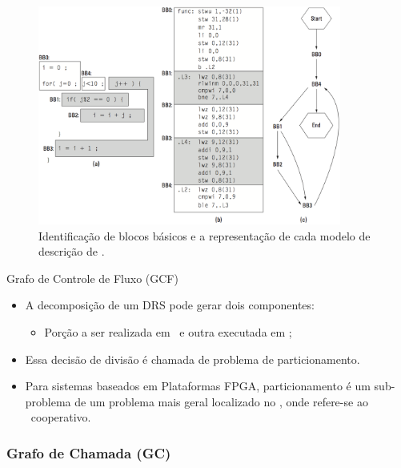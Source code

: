    \begin{frame} %
      \begin{figure}[h] \centering
         \includegraphics[width=0.89\textwidth]{img/f3-6.png}
         \caption{Identificação de blocos básicos e a representação de cada modelo de descrição de \software.}
      \end{figure}
   \end{frame}

   \begin{frame}{Grafo de Controle de Fluxo (GCF)}
      \begin{itemize}
         \setlength{\itemsep}{1.6em}
         \item A decomposição de um DRS pode gerar dois componentes: 
         \begin{itemize}
            \item Porção a ser realizada em \hardware\ e outra executada em \software;
         \end{itemize}
         
         \item Essa decisão de divisão é chamada de problema de particionamento.
         
         \item Para sistemas baseados em Plataformas FPGA, particionamento é um sub-problema de um problema mais geral localizado no \codesign, onde refere-se ao \design\ cooperativo.   
      \end{itemize}
   \end{frame}


   \subsubsection{Grafo de Chamada (GC)}
   
